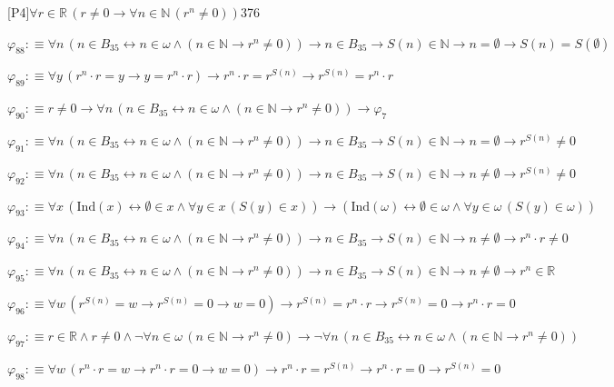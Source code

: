 \begin{fullproof}{[P4]}{$\forall r \in \mathbb{R}\,(r \neq 0 \to \forall n \in \mathbb{N}\,({{r}^{n}} \neq 0))$}{376}
\begin{abbrevlist}
\item $\varphi_{88} :\equiv \forall n\,(n \in B_{35} \leftrightarrow n \in \omega \land (n \in \mathbb{N} \to {{r}^{n}} \neq 0)) \to n \in B_{35} \to S(n) \in \mathbb{N} \to n = \emptyset \to S(n) = S(\emptyset)$
\item $\varphi_{89} :\equiv \forall y\,({{r}^{n}} \cdot r = y \to y = {{r}^{n}} \cdot r) \to {{r}^{n}} \cdot r = {{r}^{S(n)}} \to {{r}^{S(n)}} = {{r}^{n}} \cdot r$
\item $\varphi_{90} :\equiv r \neq 0 \to \forall n\,(n \in B_{35} \leftrightarrow n \in \omega \land (n \in \mathbb{N} \to {{r}^{n}} \neq 0)) \to \varphi_{7}$
\item $\varphi_{91} :\equiv \forall n\,(n \in B_{35} \leftrightarrow n \in \omega \land (n \in \mathbb{N} \to {{r}^{n}} \neq 0)) \to n \in B_{35} \to S(n) \in \mathbb{N} \to n = \emptyset \to {{r}^{S(n)}} \neq 0$
\item $\varphi_{92} :\equiv \forall n\,(n \in B_{35} \leftrightarrow n \in \omega \land (n \in \mathbb{N} \to {{r}^{n}} \neq 0)) \to n \in B_{35} \to S(n) \in \mathbb{N} \to n \neq \emptyset \to {{r}^{S(n)}} \neq 0$
\item $\varphi_{93} :\equiv \forall x\,(\mathrm{Ind}(x) \leftrightarrow \emptyset \in x \land \forall y \in x\,(S(y) \in x)) \to (\mathrm{Ind}(\omega) \leftrightarrow \emptyset \in \omega \land \forall y \in \omega\,(S(y) \in \omega))$
\item $\varphi_{94} :\equiv \forall n\,(n \in B_{35} \leftrightarrow n \in \omega \land (n \in \mathbb{N} \to {{r}^{n}} \neq 0)) \to n \in B_{35} \to S(n) \in \mathbb{N} \to n \neq \emptyset \to {{r}^{n}} \cdot r \neq 0$
\item $\varphi_{95} :\equiv \forall n\,(n \in B_{35} \leftrightarrow n \in \omega \land (n \in \mathbb{N} \to {{r}^{n}} \neq 0)) \to n \in B_{35} \to S(n) \in \mathbb{N} \to n \neq \emptyset \to {{r}^{n}} \in \mathbb{R}$
\item $\varphi_{96} :\equiv \forall w\,({{r}^{S(n)}} = w \to {{r}^{S(n)}} = 0 \to w = 0) \to {{r}^{S(n)}} = {{r}^{n}} \cdot r \to {{r}^{S(n)}} = 0 \to {{r}^{n}} \cdot r = 0$
\item $\varphi_{97} :\equiv r \in \mathbb{R} \land r \neq 0 \land \neg \forall n \in \omega\,(n \in \mathbb{N} \to {{r}^{n}} \neq 0) \to \neg \forall n\,(n \in B_{35} \leftrightarrow n \in \omega \land (n \in \mathbb{N} \to {{r}^{n}} \neq 0))$
\item $\varphi_{98} :\equiv \forall w\,({{r}^{n}} \cdot r = w \to {{r}^{n}} \cdot r = 0 \to w = 0) \to {{r}^{n}} \cdot r = {{r}^{S(n)}} \to {{r}^{n}} \cdot r = 0 \to {{r}^{S(n)}} = 0$

\end{abbrevlist}
\end{fullproof}
